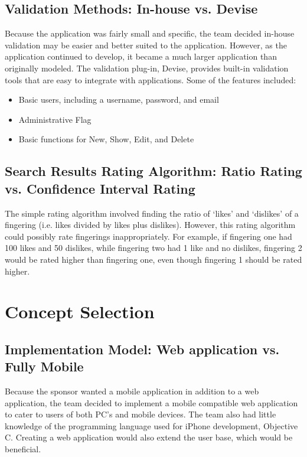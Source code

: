 \documentclass[12pt,english]{article}
\begin{document}
\subsection{Validation Methods: In-house vs. Devise}

Because the application was fairly small and specific, the team decided
in-house validation may be easier and better suited to the application.
However, as the application continued to develop, it became a much
larger application than originally modeled. The validation plug-in,
Devise, provides built-in validation tools that are easy to integrate
with applications. Some of the features included:
\begin{itemize}
\item Basic users, including a username, password, and email
\item Administrative Flag
\item Basic functions for New, Show, Edit, and Delete
\end{itemize}

\subsection{Search Results Rating Algorithm: Ratio Rating vs. Confidence Interval
Rating}

The simple rating algorithm involved finding the ratio of `likes'
and `dislikes' of a fingering (i.e. likes divided by likes plus dislikes).
However, this rating algorithm could possibly rate fingerings inappropriately.
For example, if fingering one had 100 likes and 50 dislikes, while
fingering two had 1 like and no dislikes, fingering 2 would be rated
higher than fingering one, even though fingering 1 should be rated
higher.


\section{Concept Selection}


\subsection{Implementation Model: Web application vs. Fully Mobile}

Because the sponsor wanted a mobile application in addition to a web
application, the team decided to implement a mobile compatible web
application to cater to users of both PC's and mobile devices. The
team also had little knowledge of the programming language used for
iPhone development, Objective C. Creating a web application would
also extend the user base, which would be beneficial.
\end{document}
